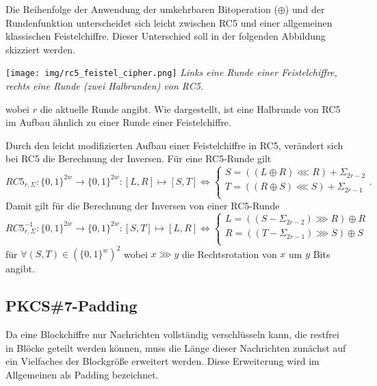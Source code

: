 \documentclass[course=erap]{aspdoc}
\begin{document}
Die Reihenfolge der Anwendung der umkehrbaren Bitoperation ($\oplus$) und der Rundenfunktion unterscheidet sich leicht zwischen RC5 und einer allgemeinen klassischen Feistelchiffre. Dieser Unterschied soll in der folgenden Abbildung skizziert werden.

\begin{samepage}
\begin{center}
    \texttt{[image: img/rc5\_feistel\_cipher.png]}\break
    \textit{Links eine Runde einer Feistelchiffre, rechts eine Runde (zwei Halbrunden) von RC5.}
\end{center}
\end{samepage}

wobei $r$ die aktuelle Runde angibt. Wie dargestellt, ist eine Halbrunde von RC5 im Aufbau ähnlich zu einer Runde einer Feistelchiffre.\bigbreak

Durch den leicht modifizierten Aufbau einer Feistelchiffre in RC5, verändert sich bei RC5 die Berechnung der Inversen. Für eine RC5-Runde gilt
\[
    RC5_{r, \Sigma} \colon \{0, 1\}^{2w} \to \{0, 1\}^{2w} \colon [L, R] \mapsto [S, T] \Leftrightarrow
        \begin{cases}
            S = ((L \oplus R) \lll R) + \Sigma_{2r-2} \\
            T = ((R \oplus S) \lll S) + \Sigma_{2r-1} \\
        \end{cases}.
\]
Damit gilt für die Berechnung der Inversen von einer RC5-Runde
\[
    RC5_{r, \Sigma}^{-1} \colon \{0, 1\}^{2w} \to \{0, 1\}^{2w} \colon [S, T] \mapsto [L, R] \Leftrightarrow
        \begin{cases}
            L = ((S - \Sigma_{2r-2}) \ggg R) \oplus R \\
            R = ((T - \Sigma_{2r-1}) \ggg S) \oplus S \\
        \end{cases}
\]
für $\forall(S, T) \in (\{0, 1\}^w)^2$ wobei $x \ggg y$ die Rechtsrotation von $x$ um $y$ Bits angibt.

\subsection{PKCS\#7-Padding}

Da eine Blockchiffre nur Nachrichten vollständig verschlüsseln kann, die restfrei in Blöcke geteilt werden können, muss die Länge dieser Nachrichten zunächst auf ein Vielfaches der Blockgröße erweitert werden. Diese Erweiterung wird im Allgemeinen als Padding bezeichnet.\bigbreak
\end{document}
